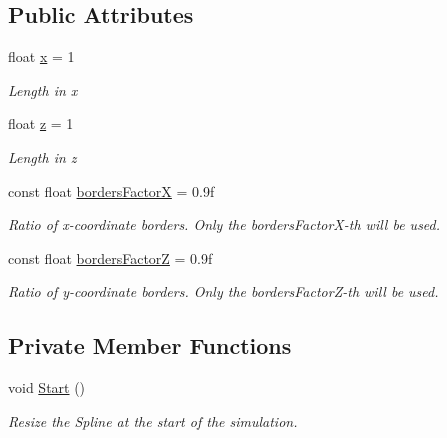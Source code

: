 \subsection*{Public Attributes}
\begin{DoxyCompactItemize}
\item 
float \hyperlink{classeasySpline_abb53dcde316e6ee14c45c1de1f033d4e}{x} = 1
\begin{DoxyCompactList}\small\item\em Length in x\end{DoxyCompactList}\item 
float \hyperlink{classeasySpline_a45bbb109c803b738a7c3a60711d9dc88}{z} = 1
\begin{DoxyCompactList}\small\item\em Length in z\end{DoxyCompactList}\item 
const float \hyperlink{classeasySpline_a15f0867bca07e689105eac1b61d92155}{borders\+FactorX} = 0.\+9f
\begin{DoxyCompactList}\small\item\em Ratio of x-\/coordinate borders. Only the borders\+Factor\+X-\/th will be used.\end{DoxyCompactList}\item 
const float \hyperlink{classeasySpline_a61234928f5a518ae8bb329f981efd903}{borders\+FactorZ} = 0.\+9f
\begin{DoxyCompactList}\small\item\em Ratio of y-\/coordinate borders. Only the borders\+Factor\+Z-\/th will be used.\end{DoxyCompactList}\end{DoxyCompactItemize}
\subsection*{Private Member Functions}
\begin{DoxyCompactItemize}
\item 
void \hyperlink{classeasySpline_aab9181ebea3a8c3ff1ee0503a282006f}{Start} ()
\begin{DoxyCompactList}\small\item\em Resize the Spline at the start of the simulation. \end{DoxyCompactList}\end{DoxyCompactItemize}
